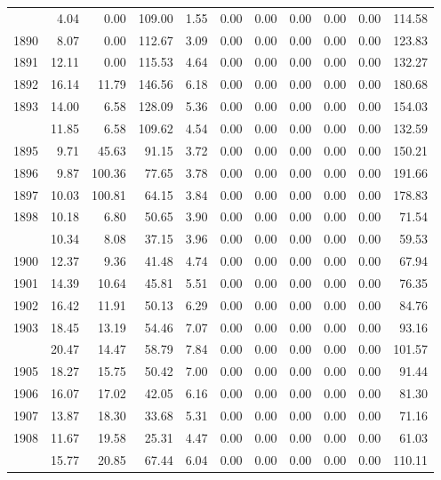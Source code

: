 \begin{longtable}[t]{rrrrrrrrrrr}
\endfoot
\bottomrule
\endlastfoot
1889 & 4.04 & 0.00 & 109.00 & 1.55 & 0.00 & 0.00 & 0.00 & 0.00 & 0.00 & 114.58\\
1890 & 8.07 & 0.00 & 112.67 & 3.09 & 0.00 & 0.00 & 0.00 & 0.00 & 0.00 & 123.83\\
1891 & 12.11 & 0.00 & 115.53 & 4.64 & 0.00 & 0.00 & 0.00 & 0.00 & 0.00 & 132.27\\
1892 & 16.14 & 11.79 & 146.56 & 6.18 & 0.00 & 0.00 & 0.00 & 0.00 & 0.00 & 180.68\\
1893 & 14.00 & 6.58 & 128.09 & 5.36 & 0.00 & 0.00 & 0.00 & 0.00 & 0.00 & 154.03\\
\addlinespace
1894 & 11.85 & 6.58 & 109.62 & 4.54 & 0.00 & 0.00 & 0.00 & 0.00 & 0.00 & 132.59\\
1895 & 9.71 & 45.63 & 91.15 & 3.72 & 0.00 & 0.00 & 0.00 & 0.00 & 0.00 & 150.21\\
1896 & 9.87 & 100.36 & 77.65 & 3.78 & 0.00 & 0.00 & 0.00 & 0.00 & 0.00 & 191.66\\
1897 & 10.03 & 100.81 & 64.15 & 3.84 & 0.00 & 0.00 & 0.00 & 0.00 & 0.00 & 178.83\\
1898 & 10.18 & 6.80 & 50.65 & 3.90 & 0.00 & 0.00 & 0.00 & 0.00 & 0.00 & 71.54\\
\addlinespace
1899 & 10.34 & 8.08 & 37.15 & 3.96 & 0.00 & 0.00 & 0.00 & 0.00 & 0.00 & 59.53\\
1900 & 12.37 & 9.36 & 41.48 & 4.74 & 0.00 & 0.00 & 0.00 & 0.00 & 0.00 & 67.94\\
1901 & 14.39 & 10.64 & 45.81 & 5.51 & 0.00 & 0.00 & 0.00 & 0.00 & 0.00 & 76.35\\
1902 & 16.42 & 11.91 & 50.13 & 6.29 & 0.00 & 0.00 & 0.00 & 0.00 & 0.00 & 84.76\\
1903 & 18.45 & 13.19 & 54.46 & 7.07 & 0.00 & 0.00 & 0.00 & 0.00 & 0.00 & 93.16\\
\addlinespace
1904 & 20.47 & 14.47 & 58.79 & 7.84 & 0.00 & 0.00 & 0.00 & 0.00 & 0.00 & 101.57\\
1905 & 18.27 & 15.75 & 50.42 & 7.00 & 0.00 & 0.00 & 0.00 & 0.00 & 0.00 & 91.44\\
1906 & 16.07 & 17.02 & 42.05 & 6.16 & 0.00 & 0.00 & 0.00 & 0.00 & 0.00 & 81.30\\
1907 & 13.87 & 18.30 & 33.68 & 5.31 & 0.00 & 0.00 & 0.00 & 0.00 & 0.00 & 71.16\\
1908 & 11.67 & 19.58 & 25.31 & 4.47 & 0.00 & 0.00 & 0.00 & 0.00 & 0.00 & 61.03\\
\addlinespace
1909 & 15.77 & 20.85 & 67.44 & 6.04 & 0.00 & 0.00 & 0.00 & 0.00 & 0.00 & 110.11\\

\end{longtable}
